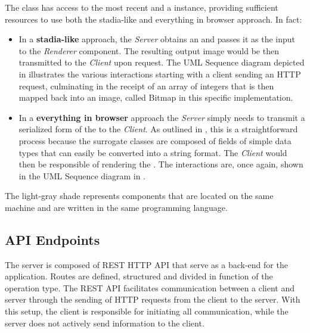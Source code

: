 The  class has access to the most recent  and a  instance, providing sufficient resources to use both the stadia-like and everything in browser approach. In fact:
\begin{itemize}
	\item In a \textbf{stadia-like} approach, the \textit{Server} obtains an  and passes it as the input to the \textit{Renderer} component. The resulting output image would be then transmitted to the \textit{Client} upon request.
	The UML Sequence diagram depicted in  illustrates the various interactions starting with a client sending an HTTP request, culminating in the receipt of an array of integers that is then mapped back into an image, called Bitmap in this specific implementation.


	\item In a \textbf{everything in browser} approach the \textit{Server} simply needs to transmit a serialized form of the  to the \textit{Client}. As outlined in , this is a straightforward process because the surrogate classes are composed of fields of simple data types that can easily be converted into a string format. The \textit{Client} would then be responsible of rendering the . The interactions are, once again, shown in the UML Sequence diagram in .
\end{itemize}
The light-gray shade represents components that are located on the same machine and are written in the same programming language.
\subsection{API Endpoints}
\label{ssec:api-endpoints}
The server is composed of REST HTTP API that serve as a back-end for the application. Routes are defined, structured and divided in function of the operation type. The REST API facilitates communication between a client and server through the sending of HTTP requests from the client to the server. With this setup, the client is responsible for initiating all communication, while the server does not actively send information to the client.\newline

